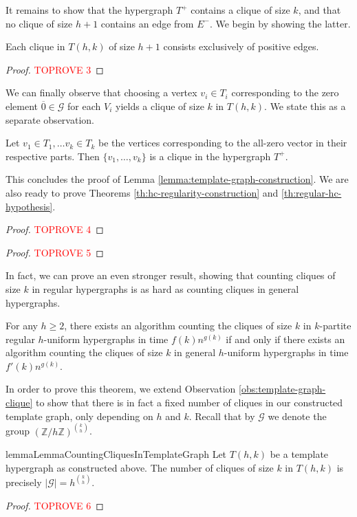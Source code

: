 \documentclass[a4paper,UKenglish,cleveref, autoref, thm-restate,numberwithinsect]{lipics-v2021}
\newcommand{\G}{\mathcal{G}}
\begin{document}
It remains to show that the hypergraph $T^+$ contains a clique of size $k$, and that no clique of size $h+1$ contains an edge from $E^-$.
We begin by showing the latter.
\begin{lemma}\label{lemma:no-negative-edges}
    Each clique in $T(h,k)$ of size $h+1$ consists exclusively of positive edges.
\end{lemma}
\begin{proof}\textcolor{red}{TOPROVE 3}\end{proof}
We can finally observe that choosing a vertex $v_i\in T_i$ corresponding to the zero element $\overline{0}\in \G$ for each $V_i$ yields a clique of size $k$ in $T(h,k)$. We state this as a separate observation.
\begin{observation}
    Let $v_1\in T_1,\dots v_k\in T_k$ be the vertices corresponding to the all-zero vector in their respective parts. Then $\{v_1,\dots, v_k\}$ is a clique in the hypergraph $T^+$.
\end{observation}
This concludes the proof of Lemma \ref{lemma:template-graph-construction}.
We are also ready to prove Theorems \ref{th:hc-regularity-construction} and \ref{th:regular-hc-hypothesis}.
\begin{proof}\textcolor{red}{TOPROVE 4}\end{proof}
\begin{proof}\textcolor{red}{TOPROVE 5}\end{proof}
In fact, we can prove an even stronger result, showing that counting cliques of size $k$ in regular hypergraphs is as hard as counting cliques in general hypergraphs. 
\begin{theorem}\label{thm:counting}
    For any $h\geq 2$, there exists an algorithm counting the cliques of size $k$ in $k$-partite regular $h$-uniform hypergraphs in time $f(k)n^{g(k)}$ if and only if there exists an algorithm counting the cliques of size $k$ in general $h$-uniform hypergraphs in time $f'(k)n^{g(k)}$.
\end{theorem}
In order to prove this theorem, we extend Observation \ref{obs:template-graph-clique} to show that there is in fact a fixed number of cliques in our constructed template graph, only depending on $h$ and $k$.
Recall that by $\G$ we denote the group $\left(\mathbb Z/h\mathbb Z\right)^{\binom{k}{h}}$. 
\begin{restatable}{lemma}{LemmaCountingCliquesInTemplateGraph}
    Let $T(h,k)$ be a template hypergraph as constructed above. The number of cliques of size $k$ in $T(h,k)$ is precisely $|\G| = h^{\binom{k}{h}}$.
\end{restatable}
\begin{proof}\textcolor{red}{TOPROVE 6}\end{proof}
\end{document}
